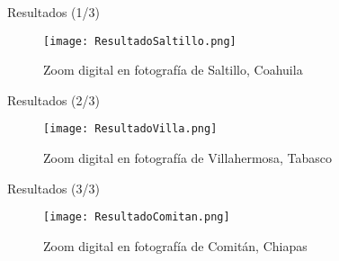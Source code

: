 \begin{frame}{Resultados (1/3)}

    \begin{figure}[H]
        \texttt{[image:  ResultadoSaltillo.png]}
        \centering
        \caption{Zoom digital en fotografía de Saltillo, Coahuila}
        \label{fig:saltillo}
    \end{figure}

\end{frame}

\begin{frame}{Resultados (2/3)}

    \begin{figure}[H]
        \texttt{[image:  ResultadoVilla.png]}
        \centering
        \caption{Zoom digital en fotografía de Villahermosa, Tabasco}
        \label{fig:villahermosa}
    \end{figure}
    
\end{frame}

\begin{frame}{Resultados (3/3)}

    \begin{figure}[H]
        \texttt{[image:  ResultadoComitan.png]}
        \centering
        \caption{Zoom digital en fotografía de Comitán, Chiapas}
        \label{fig:comitan}
    \end{figure}
    
\end{frame}